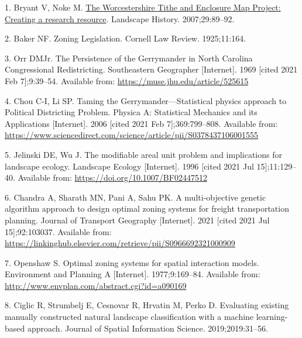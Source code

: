 \documentclass{josis}
\newlength{\cslhangindent}
\newenvironment{CSLReferences}[2] %
 {%
  \setlength{\parindent}{0pt}
  \ifodd #1 \everypar{\setlength{\hangindent}{\cslhangindent}}\ignorespaces\fi
  \ifnum #2 > 0
  \setlength{\parskip}{#2\baselineskip}
  \fi
 }%
 {}
\begin{document}
\hypertarget{refs}{}
\begin{CSLReferences}{0}{0}
\leavevmode{}%
1. Bryant V, Noke M. \href{https://doi.org/gkb5qs}{The {Worcestershire} {Tithe} and {Enclosure} {Map} {Project}: Creating a research resource}. Landscape History. 2007;29:89--92.

\leavevmode{}%
2. Baker NF. Zoning {Legislation}. Cornell Law Review. 1925;11:164.

\leavevmode{}%
3. Orr DMJr. The {Persistence} of the {Gerrymander} in {North} {Carolina} {Congressional} {Redistricting}. Southeastern Geographer {[}Internet{]}. 1969 {[}cited 2021 Feb 7{]};9:39--54. Available from: \url{https://muse.jhu.edu/article/525615}

\leavevmode{}%
4. Chou C-I, Li SP. Taming the {Gerrymander}---{Statistical} physics approach to {Political} {Districting} {Problem}. Physica A: Statistical Mechanics and its Applications {[}Internet{]}. 2006 {[}cited 2021 Feb 7{]};369:799--808. Available from: \url{https://www.sciencedirect.com/science/article/pii/S0378437106001555}

\leavevmode{}%
5. Jelinski DE, Wu J. The modifiable areal unit problem and implications for landscape ecology. Landscape Ecology {[}Internet{]}. 1996 {[}cited 2021 Jul 15{]};11:129--40. Available from: \url{https://doi.org/10.1007/BF02447512}

\leavevmode{}%
6. Chandra A, Sharath MN, Pani A, Sahu PK. A multi-objective genetic algorithm approach to design optimal zoning systems for freight transportation planning. Journal of Transport Geography {[}Internet{]}. 2021 {[}cited 2021 Jul 15{]};92:103037. Available from: \url{https://linkinghub.elsevier.com/retrieve/pii/S0966692321000909}

\leavevmode{}%
7. Openshaw S. Optimal zoning systems for spatial interaction models. Environment and Planning A {[}Internet{]}. 1977;9:169--84. Available from: \url{http://www.envplan.com/abstract.cgi?id=a090169}

\leavevmode{}%
8. Ciglic R, Strumbelj E, Cesnovar R, Hrvatin M, Perko D. Evaluating existing manually constructed natural landscape classification with a machine learning-based approach. Journal of Spatial Information Science. 2019;2019:31--56.


\end{CSLReferences}
\end{document}
